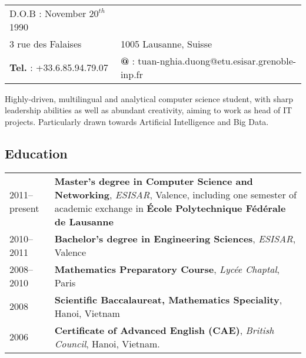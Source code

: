 \documentclass[11pt,a4paper]{article}
\begin{document}
\pagestyle{empty}


\newlength{\annee}
\settowidth{\annee}{Janvier--février}


\newlength{\texte}
\setlength{\texte}{\textwidth} \addtolength{\texte}{-\annee} 
	\addtolength{\texte}{-2\tabcolsep}

\begin{center}
 \\ 
\noindent \begin{tabular}{@{}p{8.5cm}p{8.5cm}@{}}
D.O.B : November $20^{th}$ 1990 \\
3 rue des Falaises&
1005 Lausanne, Suisse \\
\textbf{Tel.} : +33.6.85.94.79.07 &
\textbf{@} : tuan-nghia.duong@etu.esisar.grenoble-inp.fr \\
\end{tabular}
\end{center}

\indent Highly-driven, multilingual and analytical computer science student, with sharp leadership abilities
as well as abundant creativity, aiming to work as head of IT projects. Particularly drawn towards Artificial
Intelligence and Big Data.

\subsection*{Education}
\noindent \begin{tabular}{@{}p{\annee}p{\texte}@{}}

2011--present & \textbf{Master’s degree in Computer Science and Networking}, \textit{ESISAR}, Valence, including one semester of academic exchange in \textbf{École Polytechnique Fédérale de Lausanne} \\
2010--2011 & \textbf{Bachelor's degree in Engineering Sciences}, \textit{ESISAR}, Valence \\
2008--2010 & \textbf{Mathematics Preparatory Course}, \textit{Lycée Chaptal}, Paris \\
2008 & \textbf{Scientific Baccalaureat, Mathematics Speciality}, Hanoi, Vietnam \\
2006 & \textbf{Certificate of Advanced English (CAE)}, \textit{British Council}, Hanoi, Vietnam.
\end{tabular}
\end{document}
